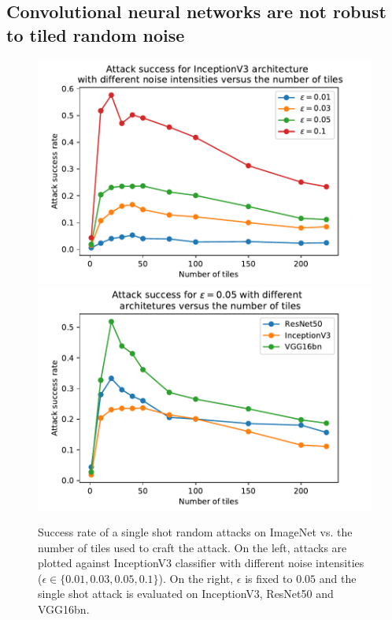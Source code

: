 
\subsection{Convolutional neural networks are not robust to tiled  random noise}\label{ahyes}

\begin{figure}
\centering

\includegraphics[width=.45\textwidth]{sections/appendix/arxiv_dfo/images/randnoise_inception.pdf}
\includegraphics[width=.45\textwidth]{sections/appendix/arxiv_dfo/images/rand_005.pdf}    

\caption{\label{til}Success rate of a single shot random attacks on ImageNet vs. the number of tiles used to craft the attack. On the left, attacks are plotted against InceptionV3 classifier with different noise intensities ($\epsilon\in\{0.01,0.03,0.05,0.1\}$). On the right, $\epsilon$ is fixed to $0.05$ and the single shot attack is evaluated on InceptionV3, ResNet50 and VGG16bn.}
\end{figure}

